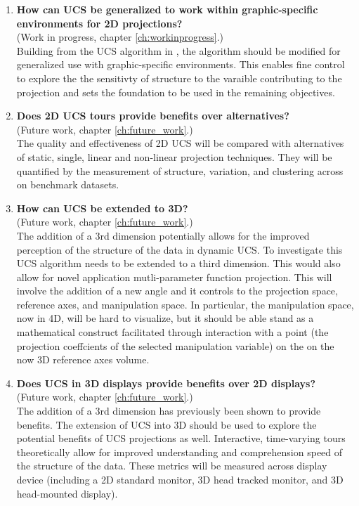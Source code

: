 \documentclass{monashthesis}
\begin{document}
\begin{enumerate}
\def\labelenumi{\arabic{enumi}.}
\item
  \textbf{How can UCS be generalized to work within graphic-specific
  environments for 2D projections?}\\
  (Work in progress, chapter \ref{ch:workinprogress}.)\\
  Building from the UCS algorithm in \textcite{cook_manual_1997}, the
  algorithm should be modified for generalized use with graphic-specific
  environments. This enables fine control to explore the the sensitivty
  of structure to the varaible contributing to the projection and sets
  the foundation to be used in the remaining objectives.
\item
  \textbf{Does 2D UCS tours provide benefits over alternatives?}\\
  (Future work, chapter \ref{ch:future_work}.)\\
  The quality and effectiveness of 2D UCS will be compared with
  alternatives of static, single, linear and non-linear projection
  techniques. They will be quantified by the measurement of structure,
  variation, and clustering across on benchmark datasets.
\item
  \textbf{How can UCS be extended to 3D?}\\
  (Future work, chapter \ref{ch:future_work}.)\\
  The addition of a 3rd dimension potentially allows for the improved
  perception of the structure of the data in dynamic UCS. To investigate
  this UCS algorithm needs to be extended to a third dimension. This
  would also allow for novel application mutli-parameter function
  projection. This will involve the addition of a new angle and it
  controls to the projection space, reference axes, and manipulation
  space. In particular, the manipulation space, now in 4D, will be hard
  to visualize, but it should be able stand as a mathematical construct
  facilitated through interaction with a point (the projection
  coeffcients of the selected manipulation variable) on the on the now
  3D reference axes volume.
\item
  \textbf{Does UCS in 3D displays provide benefits over 2D displays?}\\
  (Future work, chapter \ref{ch:future_work}.)\\
  The addition of a 3rd dimension has previously been shown to provide
  benefits. The extension of UCS into 3D should be used to explore the
  potential benefits of UCS projections as well. Interactive,
  time-varying tours theoretically allow for improved understanding and
  comprehension speed of the structure of the data. These metrics will
  be measured across display device (including a 2D standard monitor, 3D
  head tracked monitor, and 3D head-mounted display).
\end{enumerate}
\end{document}
